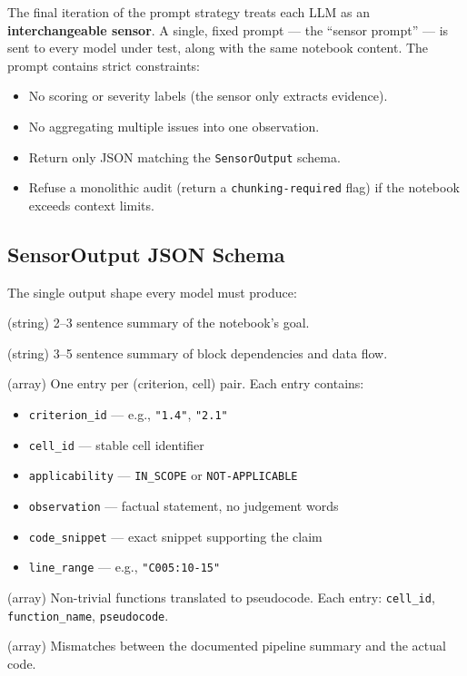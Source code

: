 \documentclass[11pt, a4paper]{article}
\begin{document}
The final iteration of the prompt strategy treats each LLM as an
\textbf{interchangeable sensor}. A single, fixed prompt — the ``sensor prompt''
— is sent to every model under test, along with the same notebook content. The
prompt contains strict constraints:

\begin{itemize}
  \item No scoring or severity labels (the sensor only extracts evidence).
  \item No aggregating multiple issues into one observation.
  \item Return only JSON matching the \texttt{SensorOutput} schema.
  \item Refuse a monolithic audit (return a \texttt{chunking-required} flag)
        if the notebook exceeds context limits.
\end{itemize}

\subsection{SensorOutput JSON Schema}

The single output shape every model must produce:

\begin{description}[leftmargin=*]
  \item[\texttt{overall\_purpose}] (string) 2--3 sentence summary of the
        notebook's goal.

  \item[\texttt{pipeline\_summary}] (string) 3--5 sentence summary of block
        dependencies and data flow.

  \item[\texttt{observations}] (array) One entry per (criterion, cell) pair.
        Each entry contains:
        \begin{itemize}
          \item \texttt{criterion\_id} — e.g., \texttt{"1.4"}, \texttt{"2.1"}
          \item \texttt{cell\_id} — stable cell identifier
          \item \texttt{applicability} — \texttt{IN\_SCOPE} or \texttt{NOT-APPLICABLE}
          \item \texttt{observation} — factual statement, no judgement words
          \item \texttt{code\_snippet} — exact snippet supporting the claim
          \item \texttt{line\_range} — e.g., \texttt{"C005:10-15"}
        \end{itemize}

  \item[\texttt{complex\_functions}] (array) Non-trivial functions translated
        to pseudocode. Each entry: \texttt{cell\_id}, \texttt{function\_name},
        \texttt{pseudocode}.

  \item[\texttt{cross\_reference\_discrepancies}] (array) Mismatches between
        the documented pipeline summary and the actual code.
\end{description}
\end{document}
